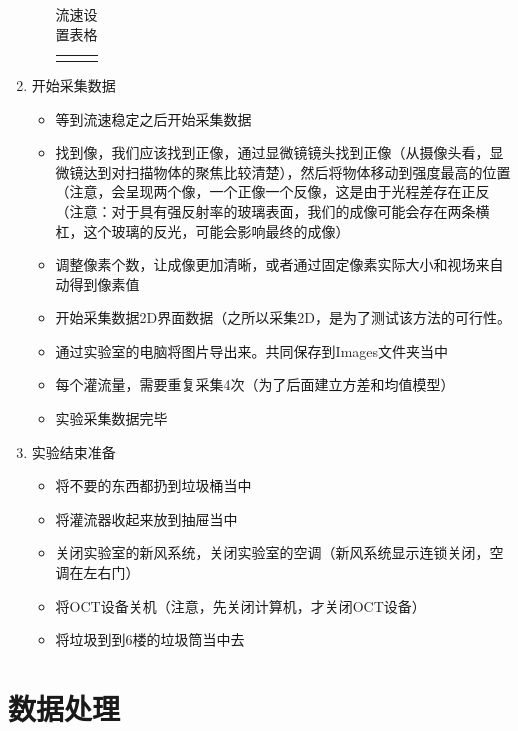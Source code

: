 \documentclass[12pt]{article}
\begin{document}
\begin{enumerate}
\begin{itemize}
\begin{longtable}{@{} p{5cm} p{5cm} p{5cm} @{}}
           \bottomrule
           \caption{流速设置表格} \\
       \end{longtable}

    
    \end{itemize}

    \item 开始采集数据
    \begin{itemize}
        \item 等到流速稳定之后开始采集数据
        \item 找到像，我们应该找到正像，通过显微镜镜头找到正像（从摄像头看，显微镜达到对扫描物体的聚焦比较清楚），然后将物体移动到强度最高的位置（注意，会呈现两个像，一个正像一个反像，这是由于光程差存在正反
        （注意：对于具有强反射率的玻璃表面，我们的成像可能会存在两条横杠，这个玻璃的反光，可能会影响最终的成像）
        \item 调整像素个数，让成像更加清晰，或者通过固定像素实际大小和视场来自动得到像素值
        \item 开始采集数据2D界面数据（之所以采集2D，是为了测试该方法的可行性。
        \item 通过实验室的电脑将图片导出来。共同保存到Images文件夹当中
        \item 每个灌流量，需要重复采集4次（为了后面建立方差和均值模型）
        \item 实验采集数据完毕
    \end{itemize}

    \item 实验结束准备
    \begin{itemize}
        \item 将不要的东西都扔到垃圾桶当中
        \item 将灌流器收起来放到抽屉当中
        \item 关闭实验室的新风系统，关闭实验室的空调（新风系统显示连锁关闭，空调在左右门）
        \item 将OCT设备关机（注意，先关闭计算机，才关闭OCT设备）
        \item  将垃圾到到6楼的垃圾筒当中去
    \end{itemize}
    \end{enumerate}
    
    \section{数据处理}
\end{document}

